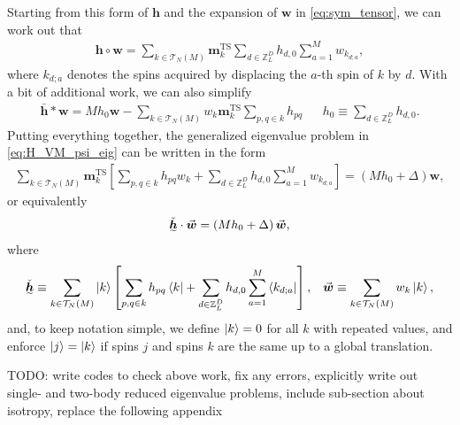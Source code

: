 \documentclass[nofootinbib,notitlepage,11pt]{revtex4-2}
\renewcommand{\t}{\text} %
\newcommand{\p}[1]{\left(#1\right)} %
\renewcommand{\sp}[1]{\left[#1\right]} %
\renewcommand{\c}{\cdot} %
\newcommand{\m}{\bm} %
\renewcommand{\v}{\vec} %
\newcommand{\1}{\mathds{1}}
\newcommand{\T}{\mathcal{T}}
\newcommand{\ZZ}{\mathbb{Z}}
\newcommand{\ut}{\undertilde}
\newcommand{\red}[1]{{\color{red} #1}}
\begin{document}
Starting from this form of $\m h$ and the expansion of $\m w$ in
\eqref{eq:sym_tensor}, we can work out that
\begin{align}
  \m h\circ\m w
  = \sum_{k\in\T_N\p{M}} \m m_k^{\t{TS}}
  \sum_{d\in\ZZ_L^D} h_{d,0} \sum_{a=1}^M w_{k_{d;a}},
\end{align}
where $k_{d;a}$ denotes the spins acquired by displacing the $a$-th
spin of $k$ by $d$.  With a bit of additional work, we can also
simplify
\begin{align}
  \bar{\m h} * \m w = M h_0 \m w
  - \sum_{k\in\T_N\p{M}} w_k \m m_k^{\t{TS}}
  \sum_{p,q\in k} h_{pq}
  &&
  h_0 \equiv \sum_{d\in\ZZ_L^D} h_{d,0}.
\end{align}
Putting everything together, the generalized eigenvalue problem in
\eqref{eq:H_VM_psi_eig} can be written in the form
\begin{align}
  \sum_{k\in\T_N\p{M}} \m m_k^{\t{TS}}
  \sp{\sum_{p,q\in k} h_{pq} w_k
    + \sum_{d\in\ZZ_L^D} h_{d,0} \sum_{a=1}^M w_{k_{d;a}}}
  = \p{M h_0 + \Delta} \m w,
\end{align}
or equivalently
\begin{align}
  \ut{\check{\m h}} \c \v{\m w} = \p{M h_0 + \Delta} \v{\m w},
  \label{eq:H_VM_eig_simp}
\end{align}
where
\begin{align}
  \ut{\check{\m h}} \equiv
  \sum_{k\in\T_N\p{M}} \ket{k}
  \sp{\sum_{p,q\in k} h_{pq} \bra{k}
    + \sum_{d\in\ZZ_L^D} h_{d,0} \sum_{a=1}^M \bra{k_{d;a}}},
  &&
  \v{\m w} \equiv \sum_{k\in\T_N\p{M}} w_k \ket{k},
\end{align}
and, to keep notation simple, we define $\ket{k}=0$ for all $k$ with
repeated values, and enforce $\ket{j}=\ket{k}$ if spins $j$ and spins
$k$ are the same up to a global translation.



\vspace{1cm}

\red{TODO: write codes to check above work, fix any errors, explicitly
  write out single- and two-body reduced eigenvalue problems, include
  sub-section about isotropy, replace the following appendix}
\end{document}
